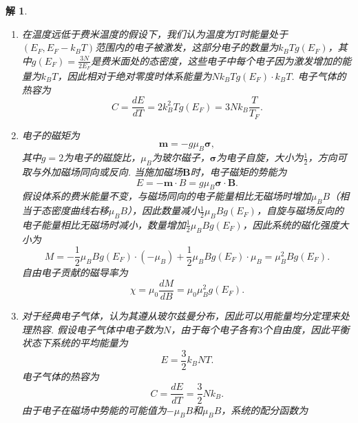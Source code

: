 \documentclass[UTF8,10pt,a4paper]{article}
\theoremstyle{Problem}
\theoremstyle{Solution}
\newtheorem*{sol}{解}
\begin{document}
\begin{sol}
    \begin{enumerate}
        \item[(a)] 在温度远低于费米温度的假设下，我们认为温度为$T$时能量处于$(E_F,E_F-k_BT)$范围内的电子被激发，这部分电子的数量为$k_BTg(E_F)$，其中$g(E_F)=\frac{3N}{2E_F}$是费米面处的态密度，这些电子中每个电子因为激发增加的能量为$k_BT$，因此相对于绝对零度时体系能量为$Nk_BTg(E_F)\cdot k_BT$. 电子气体的热容为
        \begin{equation}
            C=\frac{dE}{dT}=2k_B^2Tg(E_F)=3Nk_B\frac{T}{T_F}.
        \end{equation}
        \item[(b)] 电子的磁矩为
        \begin{equation}
            \bm{m}=-g\mu_B\bm{\sigma},
        \end{equation}
        其中$g=2$为电子的磁旋比，$\mu_B$为玻尔磁子，$\bm{\sigma}$为电子自旋，大小为$\frac{1}{2}$，方向可取与外加磁场同向或反向.
        当施加磁场$\bm{B}$时，电子磁矩的势能为
        \begin{equation}
            E=-\bm{m}\cdot{B}=g\mu_B\bm{\sigma}\cdot\bm{B}.
        \end{equation}
        假设体系的费米能量不变，与磁场同向的电子能量相比无磁场时增加$\mu_BB$（相当于态密度曲线右移$\mu_BB$），因此数量减小$\frac{1}{2}\mu_BBg(E_F)$，自旋与磁场反向的电子能量相比无磁场时减小，数量增加$\frac{1}{2}\mu_BBg(E_F)$，因此系统的磁化强度大小为
        \begin{equation}
            M=-\frac{1}{2}\mu_BBg(E_F)\cdot(-\mu_B)+\frac{1}{2}\mu_BBg(E_F)\cdot\mu_B=\mu_B^2Bg(E_F).
        \end{equation}
        自由电子贡献的磁导率为
        \begin{equation}
            \chi=\mu_0\frac{dM}{dB}=\mu_0\mu_B^2g(E_F).
        \end{equation}
        \item[(c)] 对于经典电子气体，认为其遵从玻尔兹曼分布，因此可以用能量均分定理来处理热容. 假设电子气体中电子数为$N$，由于每个电子各有$3$个自由度，因此平衡状态下系统的平均能量为
        \begin{equation}
            E=\frac{3}{2}k_BNT.
        \end{equation}
        电子气体的热容为
        \begin{equation}
            C=\frac{dE}{dT}=\frac{3}{2}Nk_B.
        \end{equation}
        由于电子在磁场中势能的可能值为$-\mu_BB$和$\mu_BB$，系统的配分函数为

\end{enumerate}
\end{sol}
\end{document}
